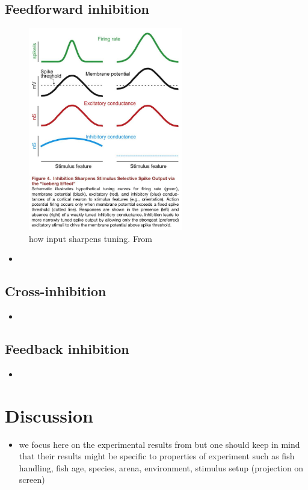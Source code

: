 \documentclass[a4paper,10pt,hidelinks]{scrartcl}
\begin{document}
	\subsection{Feedforward inhibition}
	\begin{figure}[H]
		\centering
		\includegraphics[width=0.6\textwidth, 
		height=0.4\textheight]{../figures/isaacson2001_figure4.jpg}
		\caption{how input sharpens tuning. From \cite{Isaacson2011}}
		\label{fig:feedf}
	\end{figure}
	\begin{itemize}
		\item 
	\end{itemize}
	\subsection{Cross-inhibition}
	\begin{itemize}
		\item 
	\end{itemize}
	\subsection{Feedback inhibition}
	\begin{itemize}
		\item 
	\end{itemize}
	\section{Discussion}
	\begin{itemize}
		\item we focus here on the experimental results from 
		\cite{Bhattacharyya2017} but one should keep in mind that their results 
		might be specific to properties of experiment such as fish handling, 
		fish age, species, arena, environment, stimulus setup (projection on 
		screen)
	\end{itemize}
	\newpage
	
	
	
\end{document}
